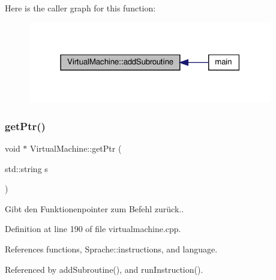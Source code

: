 Here is the caller graph for this function\+:
\nopagebreak
\begin{figure}[H]
\begin{center}
\leavevmode
\includegraphics[width=303pt]{class_virtual_machine_a52907412b34a0b747bfaa26c48253aa9_icgraph}
\end{center}
\end{figure}
\mbox{\label{class_virtual_machine_a7029636f9766e0394a8b9d60264a3565}} 
\subsubsection{\texorpdfstring{get\+Ptr()}{getPtr()}}
{\footnotesize\ttfamily void $\ast$ Virtual\+Machine\+::get\+Ptr (\begin{DoxyParamCaption}\item[{std\+::string}]{s }\end{DoxyParamCaption})\hspace{0.3cm}{\ttfamily [private]}}

Gibt den Funktionenpointer zum Befehl zurück.. 

Definition at line 190 of file virtualmachine.\+cpp.



References functions, Sprache\+::instructions, and language.



Referenced by add\+Subroutine(), and run\+Instruction().


